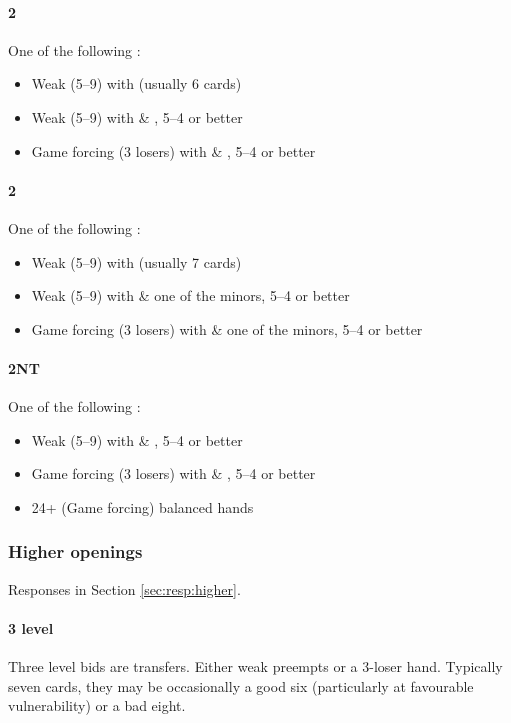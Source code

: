 \paragraph{2\hearts}
One of the following :
\begin{itemize}
\item Weak (5--9) with \spades (usually 6 cards)
\item Weak (5--9) with \clubs \& \diamonds, 5--4 or better
\item Game forcing (3 losers) with \clubs \& \diamonds, 5--4 or better
\end{itemize}

\paragraph{2\spades}
One of the following :
\begin{itemize}
\item Weak (5--9) with \clubs (usually 7 cards)
\item Weak (5--9) with \hearts \& one of the minors, 5--4 or better
\item Game forcing (3 losers) with \hearts \& one of the minors, 5--4 or better 
\end{itemize}

\paragraph{2NT}
One of the following :
\begin{itemize}
\item Weak (5--9) with \spades \& \diamonds, 5--4 or better
\item Game forcing (3 losers) with \spades \& \diamonds, 5--4 or better
\item 24+ (Game forcing) balanced hands
\end{itemize}

\subsubsection{Higher openings}
\label{sec:open:higher}

Responses in Section \ref{sec:resp:higher}.

\paragraph{3 level}

Three level bids are transfers. Either weak preempts or a 3-loser hand.
Typically seven cards, they may be occasionally a good six (particularly at
favourable vulnerability) or a bad eight.

